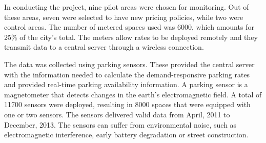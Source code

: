 
In conducting the project, nine pilot areas were chosen for monitoring. Out of these areas, seven were selected to have new pricing policies, while two were control areas. The number of metered spaces used was 6000, which amounts for 25\% of the city's total. The meters allow rates to be deployed remotely and they transmit data to a central server through a wireless connection.

The data was collected using parking sensors. These provided the central server with the information needed to calculate the demand-responsive parking rates and provided real-time parking availability information. A parking sensor is a magnetometer that detects changes in the earth's electromagnetic field. A total of 11700 sensors were deployed, resulting in 8000 spaces that were equipped with one or two sensors. The sensors delivered valid data from April, 2011 to December, 2013. The sensors can suffer from environmental noise, such as electromagnetic interference, early battery degradation or street construction. 

